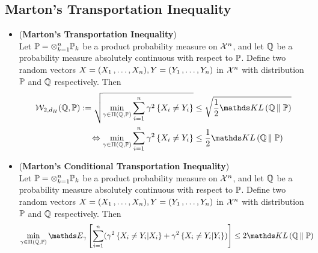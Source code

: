 \documentclass[11pt]{article}
\begin{document}
\subsection{Marton's Transportation Inequality}
\begin{itemize}
\item \begin{theorem} (\textbf{Marton's Transportation Inequality}) \citep{boucheron2013concentration}\\
Let ${\mathbb P} = \otimes_{k=1}^n {\mathbb P}_k$ be a product probability measure on ${\mathcal X}^n$, and let ${\mathbb Q}$ be a probability measure absolutely continuous with respect to ${\mathbb P}$. Define two random vectors $X = (X_1 \,{,}\ldots{,}\, X_n), Y = (Y_1 \,{,}\ldots{,}\, Y_n)$ in ${\mathcal X}^n$ with distribution ${\mathbb P}$ and ${\mathbb Q}$ respectively.  Then
\begin{align}
\cW_{2, d_H}(\bQ, \bP) := \sqrt{\min_{\gamma \in \Pi(\bQ, \bP)}\sum_{i=1}^n\gamma^2\set{X_i \neq Y_i}} &\le \sqrt{\frac{1}{2}\kl{\bQ}{\bP}} \label{ineqn: marton_transport_cost_inequality} \\
\Leftrightarrow  \min_{\gamma \in \Pi(\bQ, \bP)}\sum_{i=1}^n \gamma^2\set{X_i \neq Y_i} &\le \frac{1}{2}\kl{\bQ}{\bP} \nonumber
\end{align}
\end{theorem}

\item \begin{theorem} (\textbf{Marton's Conditional Transportation Inequality}) \citep{boucheron2013concentration}\\
Let ${\mathbb P} = \otimes_{k=1}^n {\mathbb P}_k$ be a product probability measure on ${\mathcal X}^n$, and let ${\mathbb Q}$ be a probability measure absolutely continuous with respect to ${\mathbb P}$. Define two random vectors $X = (X_1 \,{,}\ldots{,}\, X_n), Y = (Y_1 \,{,}\ldots{,}\, Y_n)$ in ${\mathcal X}^n$ with distribution ${\mathbb P}$ and ${\mathbb Q}$ respectively.  Then
\begin{align}
 \min_{\gamma \in \Pi(\bQ, \bP)}\E{\gamma}{\sum_{i=1}^n(\gamma^2\set{X_i \neq Y_i | X_i} + \gamma^2\set{X_i \neq Y_i | Y_i})} &\le 2\kl{\bQ}{\bP} \label{ineqn: marton_conditional_transport_cost_inequality}
\end{align}
\end{theorem}


\end{itemize}
\end{document}
